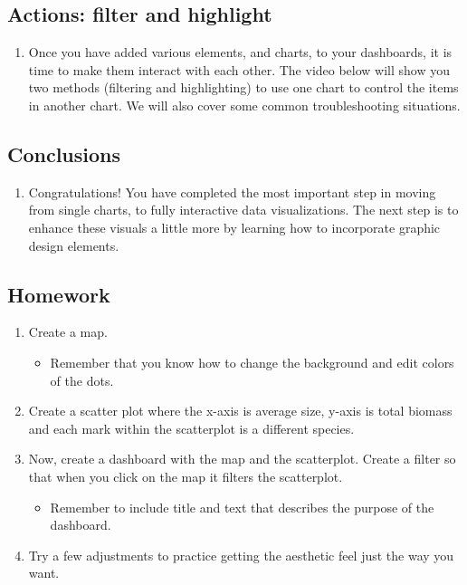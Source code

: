 \documentclass[
]{book}
\providecommand{\tightlist}{%
  \setlength{\itemsep}{0pt}\setlength{\parskip}{0pt}}
\begin{document}
\hypertarget{actions-filter-and-highlight}{%
\subsection{Actions: filter and highlight}\label{actions-filter-and-highlight}}

\begin{enumerate}
\def\labelenumi{\arabic{enumi}.}
\tightlist
\item
  Once you have added various elements, and charts, to your dashboards, it is time to make them interact with each other. The video below will show you two methods (filtering and highlighting) to use one chart to control the items in another chart. We will also cover some common troubleshooting situations.
\end{enumerate}

\hypertarget{conclusions-2}{%
\subsection{Conclusions}\label{conclusions-2}}

\begin{enumerate}
\def\labelenumi{\arabic{enumi}.}
\tightlist
\item
  Congratulations! You have completed the most important step in moving from single charts, to fully interactive data visualizations. The next step is to enhance these visuals a little more by learning how to incorporate graphic design elements.
\end{enumerate}

\hypertarget{homework-1}{%
\subsection{Homework}\label{homework-1}}

\begin{enumerate}
\def\labelenumi{\arabic{enumi}.}
\tightlist
\item
  Create a map.

  \begin{itemize}
  \tightlist
  \item
    Remember that you know how to change the background and edit colors of the dots.
  \end{itemize}
\item
  Create a scatter plot where the x-axis is average size, y-axis is total biomass and each mark within the scatterplot is a different species.
\item
  Now, create a dashboard with the map and the scatterplot. Create a filter so that when you click on the map it filters the scatterplot.

  \begin{itemize}
  \tightlist
  \item
    Remember to include title and text that describes the purpose of the dashboard.
  \end{itemize}
\item
  Try a few adjustments to practice getting the aesthetic feel just the way you want.
\end{enumerate}
\end{document}
